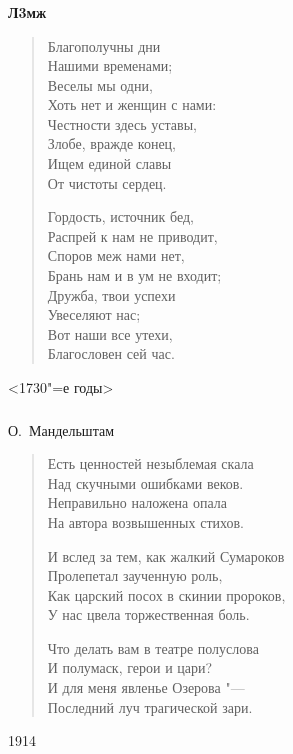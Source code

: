 \documentclass{beamer}
\begin{document}
\begin{frame}
\frametitle{}

\textbf{Л3мж}
\begin{verse}
Благополучны дни\\
Нашими временами;\\
Веселы мы одни,\\
Хоть нет и женщин с нами:\\
Честности здесь уставы,\\
Злобе, вражде конец,\\
Ищем единой славы\\
От чистоты сердец.

Гордость, источник бед,\\
Распрей к нам не приводит,\\
Споров меж нами нет,\\
Брань нам и в ум не входит;\\
Дружба, твои успехи\\
Увеселяют нас;\\
Вот наши все утехи,\\
Благословен сей час.

\end{verse}
<1730"=е годы>
\end{frame}



\begin{frame}
\frametitle{}

О.~Мандельштам

\begin{verse}
Есть ценностей незыблемая скала\\
Над скучными ошибками веков.\\
Неправильно наложена опала\\
На автора возвышенных стихов.

И вслед за тем, как жалкий Сумароков\\
Пролепетал заученную роль,\\
Как царский посох в скинии пророков,\\
У нас цвела торжественная боль.

Что делать вам в театре полуслова\\
И полумаск, герои и цари?\\
И для меня явленье Озерова "---\\
Последний луч трагической зари. 

\end{verse}
1914

\end{frame}
\end{document}
